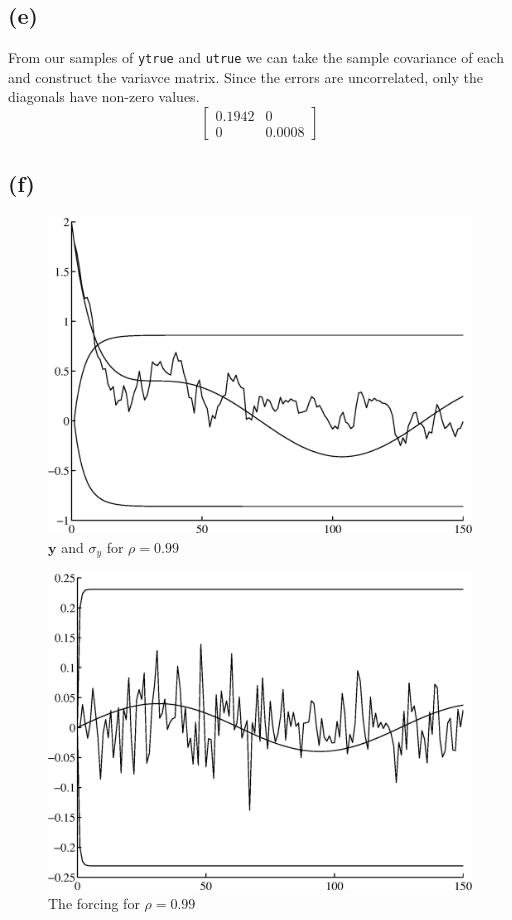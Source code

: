 \documentclass[fleqn, letterpaper]{tufte-handout}
\newcommand{\y}{\mathbf{y}}
\begin{document}
\subsection{(e)}
From our samples of \texttt{ytrue} and \texttt{utrue} we can take the sample covariance of each and construct the variavce matrix. Since the errors are uncorrelated, only the diagonals have non-zero values.
\[
\begin{bmatrix} 0.1942 & 0 \\ 0 & 0.0008
\end{bmatrix}
\]
\subsection{(f)}
\begin{figure}
        \includegraphics[width=\textwidth]{2fa}
        \caption{$\y$ and $\sigma_y$ for $\rho=0.99$}
        \label{2fa}
\end{figure}
\begin{figure}
        \includegraphics[width=\textwidth]{2fb}
        \caption{The forcing for $\rho=0.99$}
        \label{2fb}
\end{figure}
{\scriptsize
        \begin{minipage}{\linewidth}
                
        \end{minipage}
}
\end{document}

